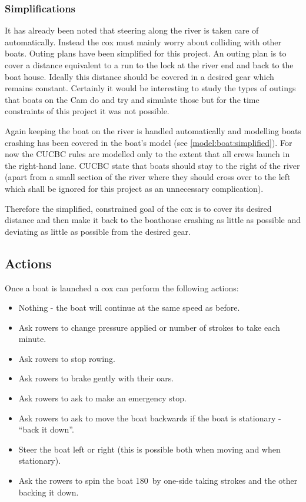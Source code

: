       \subsubsection{Simplifications} \label{model:cox:goals:simplifications}
      It has already been noted that steering along the river is taken care of automatically. Instead the cox must mainly worry about colliding with other boats. Outing plans have been simplified for this project. An outing plan is to cover a distance equivalent to a run to the lock at the river end and back to the boat house. Ideally this distance should be covered in a desired gear which remains constant. Certainly it would be interesting to study the types of outings that boats on the Cam do and try and simulate those but for the time constraints of this project it was not possible.
      
      Again keeping the boat on the river is handled automatically and modelling boats crashing has been covered in the boat's model (see \ref{model:boat:simplified}). For now the CUCBC rules are modelled only to the extent that all crews launch in the right-hand lane. CUCBC state that boats should stay to the right of the river (apart from a small section of the river where they should cross over to the left which shall be ignored for this project as an unnecessary complication).
      
      Therefore the simplified, constrained goal of the cox is to cover its desired distance and then make it back to the boathouse crashing as little as possible and deviating as little as possible from the desired gear.

      \subsection{Actions} \label{model:cox:actions}
      Once a boat is launched a cox can perform the following actions:
      \begin{itemize}
        \item Nothing - the boat will continue at the same speed as before.
        \item Ask rowers to change pressure applied or number of
          strokes to take each minute.
        \item Ask rowers to stop rowing.
        \item Ask rowers to brake gently with their oars.
        \item Ask rowers to ask to make an emergency stop.
        \item Ask rowers to ask to move the boat backwards if the boat
          is stationary - ``back it down''.
        \item Steer the boat left or right (this is possible both when moving and when stationary).
        \item Ask the rowers to spin the boat 180\textdegree\ by
          one-side taking strokes and the other backing it down.
      \end{itemize}
      
